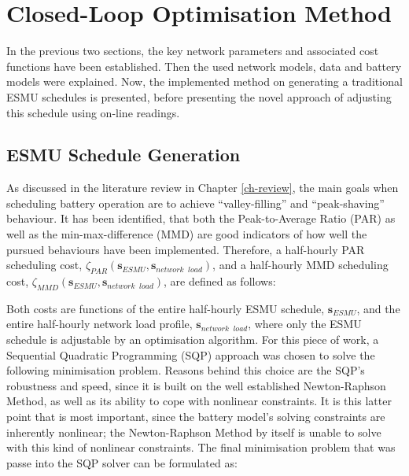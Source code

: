 \section{Closed-Loop Optimisation Method}
\label{ch1:sec:closed-loop-optimisation-method}

In the previous two sections, the key network parameters and associated cost functions have been established.
Then the used network models, data and battery models were explained.
Now, the implemented method on generating a traditional ESMU schedules is presented, before presenting the novel approach of adjusting this schedule using on-line readings.

\subsection{ESMU Schedule Generation}
\label{ch1:subsec:esmu-schedule-generation}

As discussed in the literature review in Chapter \ref{ch-review}, the main goals when scheduling battery operation are to achieve ``valley-filling'' and ``peak-shaving'' behaviour.
It has been identified, that both the Peak-to-Average Ratio (PAR) as well as the min-max-difference (MMD) are good indicators of how well the pursued behaviours have been implemented.
Therefore, a half-hourly PAR scheduling cost, $\zeta_{PAR}(\textbf{s}_{ESMU}, \textbf{s}_{network\;\;load})$, and a half-hourly MMD scheduling cost, $\zeta_{MMD}(\textbf{s}_{ESMU}, \textbf{s}_{network\;\;load})$, are defined as follows:





Both costs are functions of the entire half-hourly ESMU schedule, $\textbf{s}_{ESMU}$, and the entire half-hourly network load profile, $\textbf{s}_{network\;\;load}$, where only the ESMU schedule is adjustable by an optimisation algorithm.
For this piece of work, a Sequential Quadratic Programming (SQP) approach was chosen to solve the following minimisation problem.
Reasons behind this choice are the SQP's robustness and speed, since it is built on the well established Newton-Raphson Method, as well as its ability to cope with nonlinear constraints.
It is this latter point that is most important, since the battery model's solving constraints are inherently nonlinear; the Newton-Raphson Method by itself is unable to solve with this kind of nonlinear constraints.
The final minimisation problem that was passe into the SQP solver can be formulated as:

